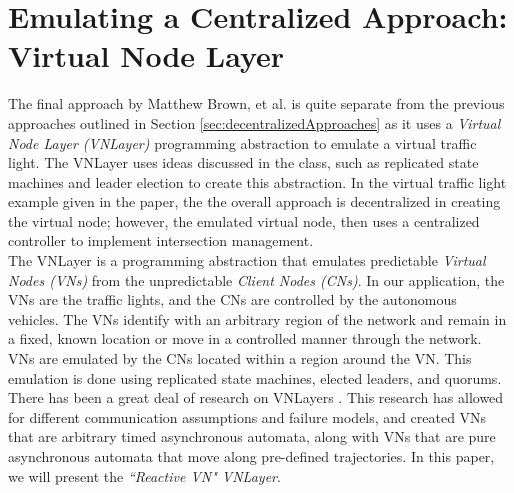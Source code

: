 \documentclass[12pt]{article}
\begin{document}
\section{Emulating a Centralized Approach: Virtual Node Layer}
\label{sec:VNLayer}
The final approach by Matthew Brown, et al. \cite{vnlayer} is quite separate from the previous approaches outlined in Section \ref{sec:decentralizedApproaches} as it uses a {\em Virtual Node Layer (VNLayer)} programming abstraction to emulate a virtual traffic light.  The VNLayer uses ideas discussed in the class, such as replicated state machines and leader election to create this abstraction. In the virtual traffic light example given in the paper, the the overall approach is decentralized in creating the virtual node; however, the emulated virtual node, then uses a centralized controller to implement intersection management.  
\\
The VNLayer is a programming abstraction that emulates predictable {\em Virtual Nodes (VNs)} from the unpredictable {\em Client Nodes (CNs)}. In our application, the VNs are the traffic lights, and the CNs are controlled by the autonomous vehicles.  The VNs identify with an arbitrary region of the network and remain in a fixed, known location  or move in a controlled manner through the network.  VNs are emulated by the CNs located within a region around the VN.  This emulation is done using replicated state machines, elected leaders, and quorums.  
There has been a great deal of research on VNLayers \cite{vn1}\cite{vn2}\cite{vn3}\cite{vn4}.   
This research has allowed for different communication assumptions and failure models, and created VNs that are arbitrary timed asynchronous automata, along with VNs that are pure asynchronous automata that move along pre-defined trajectories. In this paper, we will present the {\em ``Reactive VN" VNLayer}.\cite{vnlayer}
\end{document}
